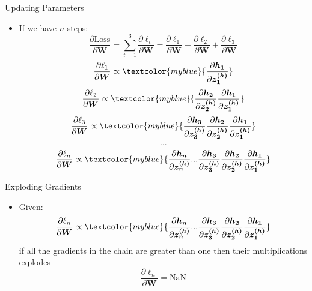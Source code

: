 \begin{frame}{Updating Parameters}
\centering
\begin{itemize}
    \item If we have  $n$ steps: 
    \begin{equation*}
        \frac{\partial \text{Loss}}{ \partial \bm{W}} 
         = \sum_{t=1}^{3}   \frac{\partial \ell_t}{\partial \bm{W}} = \frac{\partial \ell_1}{\partial \bm{W}}  + \frac{\partial \ell_2}{\partial \bm{W}} + \frac{\partial \ell_3}{\partial \bm{W}}
    \end{equation*}
    \begin{equation*}
        \frac{\partial \ell_1}{\partial \bm{W}}  \propto   \textcolor{myblue}{\frac{\partial \bm{h_1}}{\partial \bm{z^{(h)}_1}}}
    \end{equation*}
    \begin{equation*}
    \frac{\partial \ell_2}{\partial \bm{W}}  \propto  
        \textcolor{myblue}{
        \frac{\partial \bm{h_2}}{\partial \bm{z^{(h)}_2}}\frac{\partial \bm{h_1}}{\partial \bm{z^{(h)}_1}}
        }
    \end{equation*}
    \begin{equation*}
    \frac{\partial \ell_3}{\partial \bm{W}}  \propto  
        \textcolor{myblue}{
        \frac{\partial \bm{h_3}}{\partial \bm{z^{(h)}_3}}\frac{\partial \bm{h_2}}{\partial \bm{z^{(h)}_2}}\frac{\partial \bm{h_1}}{\partial \bm{z^{(h)}_1}}
        }
    \end{equation*}
    \begin{equation*}
        ...
    \end{equation*}
        \begin{equation*}
    \frac{\partial \ell_n}{\partial \bm{W}}  \propto  
        \textcolor{myblue}{
        \frac{\partial \bm{h_n}}{\partial \bm{z^{(h)}_n}} ...\frac{\partial \bm{h_3}}{\partial \bm{z^{(h)}_3}}\frac{\partial \bm{h_2}}{\partial \bm{z^{(h)}_2}}\frac{\partial \bm{h_1}}{\partial \bm{z^{(h)}_1}}
        }
    \end{equation*}     
\end{itemize}    
\end{frame}
\begin{frame}{Exploding Gradients}
    \begin{itemize}
        \item Given: 
                \begin{equation*}
    \frac{\partial \ell_n}{\partial \bm{W}}  \propto  
        \textcolor{myblue}{
        \frac{\partial \bm{h_n}}{\partial \bm{z^{(h)}_n}} ...\frac{\partial \bm{h_3}}{\partial \bm{z^{(h)}_3}}\frac{\partial \bm{h_2}}{\partial \bm{z^{(h)}_2}}\frac{\partial \bm{h_1}}{\partial \bm{z^{(h)}_1}}
        }
    \end{equation*}     
        if all the gradients in the chain are greater than one then their multiplications explodes
        \begin{equation*}
            \frac{\partial \ell_n}{\partial \bm{W}} = \text{NaN}
        \end{equation*}
    \end{itemize}
\end{frame}
